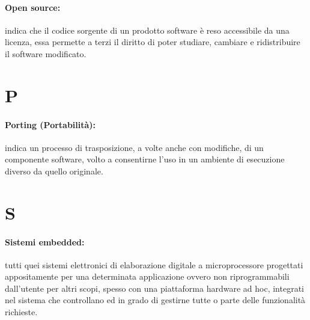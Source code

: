 \paragraph*{Open source:} indica che il codice sorgente di un prodotto software è reso accessibile da una licenza, essa permette a terzi il diritto di poter studiare, cambiare e ridistribuire il software modificato.

\section*{P}
\paragraph*{Porting (Portabilità):} indica un processo di trasposizione, a volte anche con modifiche, di un componente software, volto a consentirne l'uso in un ambiente di esecuzione diverso da quello originale.

\section*{S}
\paragraph*{Sistemi embedded:} tutti quei sistemi elettronici di elaborazione digitale a microprocessore progettati appositamente per una determinata applicazione ovvero non riprogrammabili dall'utente per altri scopi, spesso con una piattaforma hardware ad hoc, integrati nel sistema che controllano ed in grado di gestirne tutte o parte delle funzionalità richieste.

